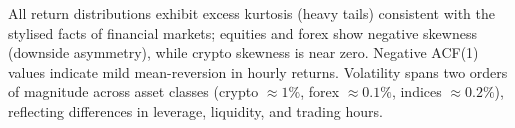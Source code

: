 \begin{table}[htbp]
\begin{threeparttable}
\begin{tabular}
    \bottomrule
  \end{tabular}
  \begin{tablenotes}[flushleft]\small
    \item All return distributions exhibit excess kurtosis (heavy tails) consistent with the
    stylised facts of financial markets; equities and forex show negative skewness (downside
    asymmetry), while crypto skewness is near zero.  Negative ACF(1) values indicate
    mild mean-reversion in hourly returns.  Volatility spans two orders of magnitude
    across asset classes (crypto $\approx 1\%$, forex $\approx 0.1\%$, indices $\approx 0.2\%$),
    reflecting differences in leverage, liquidity, and trading hours.
  \end{tablenotes}
  \end{threeparttable}
\end{table}
